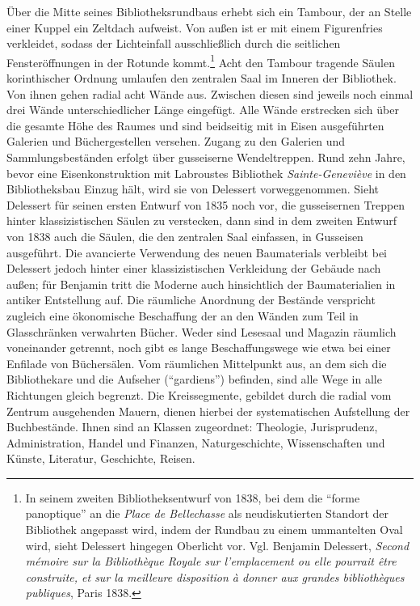 Über die Mitte seines Bibliotheksrundbaus erhebt sich ein Tambour, der
an Stelle einer Kuppel ein Zeltdach aufweist. Von außen ist er mit einem
Figurenfries verkleidet, sodass der Lichteinfall ausschließlich durch
die seitlichen Fensteröffnungen in der Rotunde kommt.\footnote{In seinem
  zweiten Bibliotheksentwurf von 1838, bei dem die \enquote{forme
  panoptique} an die \emph{Place de Bellechasse} als neudiskutierten
  Standort der Bibliothek angepasst wird, indem der Rundbau zu einem
  ummantelten Oval wird, sieht Delessert hingegen Oberlicht vor. Vgl.
  Benjamin Delessert, \emph{Second mémoire sur la Bibliothèque Royale
  sur l'emplacement ou elle pourrait être construite, et sur la
  meilleure disposition à donner aux grandes bibliothèques publiques},
  Paris 1838.} Acht den Tambour tragende Säulen korinthischer Ordnung
umlaufen den zentralen Saal im Inneren der Bibliothek. Von ihnen gehen
radial acht Wände aus. Zwischen diesen sind jeweils noch einmal drei
Wände unterschiedlicher Länge eingefügt. Alle Wände erstrecken sich über
die gesamte Höhe des Raumes und sind beidseitig mit in Eisen
ausgeführten Galerien und Büchergestellen versehen. Zugang zu den
Galerien und Sammlungsbeständen erfolgt über gusseiserne Wendeltreppen.
Rund zehn Jahre, bevor eine Eisenkonstruktion mit Labroustes Bibliothek
\emph{Sainte-Geneviève} in den Bibliotheksbau Einzug hält, wird sie von
Delessert vorweggenommen. Sieht Delessert für seinen ersten Entwurf von
1835 noch vor, die gusseisernen Treppen hinter klassizistischen Säulen
zu verstecken, dann sind in dem zweiten Entwurf von 1838 auch die
Säulen, die den zentralen Saal einfassen, in Gusseisen ausgeführt. Die
avancierte Verwendung des neuen Baumaterials verbleibt bei Delessert
jedoch hinter einer klassizistischen Verkleidung der Gebäude nach außen;
für Benjamin tritt die Moderne auch hinsichtlich der Baumaterialien in
antiker Entstellung auf. Die räumliche Anordnung der Bestände verspricht
zugleich eine ökonomische Beschaffung der an den Wänden zum Teil in
Glasschränken verwahrten Bücher. Weder sind Lesesaal und Magazin
räumlich voneinander getrennt, noch gibt es lange Beschaffungswege wie
etwa bei einer Enfilade von Büchersälen. Vom räumlichen Mittelpunkt aus,
an dem sich die Bibliothekare und die Aufseher (\enquote{gardiens})
befinden, sind alle Wege in alle Richtungen gleich begrenzt. Die
Kreissegmente, gebildet durch die radial vom Zentrum ausgehenden Mauern,
dienen hierbei der systematischen Aufstellung der Buchbestände. Ihnen
sind an Klassen zugeordnet: Theologie, Jurisprudenz, Administration,
Handel und Finanzen, Naturgeschichte, Wissenschaften und Künste,
Literatur, Geschichte, Reisen.

